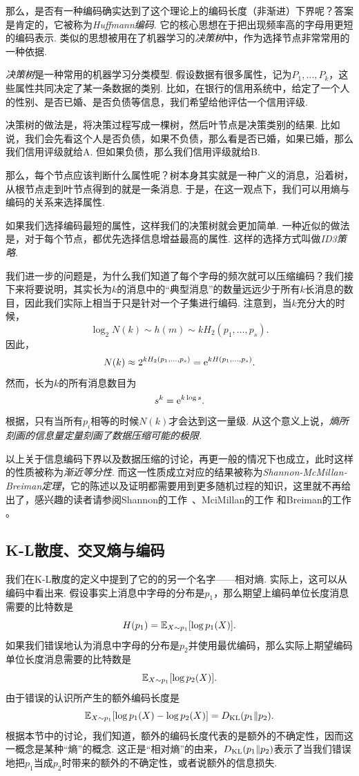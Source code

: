 那么，是否有一种编码确实达到了这个理论上的编码长度（非渐进）下界呢？答案是肯定的，它被称为\textit{Huffmann编码}. 它的核心思想在于把出现频率高的字母用更短的编码表示. 类似的思想被用在了机器学习的\textit{决策树}中，作为选择节点非常常用的一种依据.
\begin{remark}
    \textit{决策树}是一种常用的机器学习分类模型. 假设数据有很多属性，记为$P_1,\dots,P_k$，这些属性共同决定了某一条数据的类别. 比如，在银行的信用系统中，给定了一个人的性别、是否已婚、是否负债等信息，我们希望给他评估一个信用评级. 
    
    决策树的做法是，将决策过程写成一棵树，然后叶节点是决策类别的结果. 比如说，我们会先看这个人是否负债，如果不负债，那么看是否已婚，如果已婚，那么我们信用评级就给A. 但如果负债，那么我们信用评级就给B. 
    
    那么，每个节点应该判断什么属性呢？树本身其实就是一种广义的消息，沿着树，从根节点走到叶节点得到的就是一条消息. 于是，在这一观点下，我们可以用熵与编码的关系来选择属性. 

    如果我们选择编码最短的属性，这样我们的决策树就会更加简单. 一种近似的做法是，对于每个节点，都优先选择信息增益最高的属性. 这样的选择方式叫做\textit{ID3策略}.
\end{remark}

我们进一步的问题是，为什么我们知道了每个字母的频次就可以压缩编码？我们接下来将要说明，其实长为$k$的消息中的“典型消息”的数量远远少于所有$k$长消息的数目，因此我们实际上相当于只是针对一个子集进行编码. 注意到，当$k$充分大的时候，
\[\log_2 N(k)\sim h(m)\sim kH_2(p_1,\dots,p_s).\]
因此，
\[N(k)\approx 2^{kH_2(p_1,\dots,p_s)}=\mathrm{e}^{kH(p_1,\dots,p_s)}.\]
然而，长为$k$的所有消息数目为
\[s^k=\mathrm{e}^{k\log s}.\]
根据，只有当所有$p_i$相等的时候$N(k)$才会达到这一量级. 从这个意义上说，\textit{熵所刻画的信息量定量刻画了数据压缩可能的极限.}

以上关于信息编码下界以及数据压缩的讨论，再更一般的情况下也成立，此时这样的性质被称为\textit{渐近等分性}. 而这一性质成立对应的结果被称为\textit{Shannon-McMillan-Breiman定理}，它的陈述以及证明都需要用到更多随机过程的知识，这里就不再给出了，感兴趣的读者请参阅Shannon的工作~\cite{shannonMathematicalTheoryCommunication1948}、MciMillan的工作 \cite{mcmillanBasicTheoremsInformation1953} 和Breiman的工作 \cite{breimanIndividualErgodicTheorem1957}。

\subsection{K-L散度、交叉熵与编码}

我们在K-L散度的定义中提到了它的的另一个名字——相对熵. 实际上，这可以从编码中看出来. 假设事实上消息中字母的分布是$p_1$，那么期望上编码单位长度消息需要的比特数是
\[H(p_1)=\mathbb{E}_{X\sim p_1}[\log p_1(X)].\] 
如果我们错误地认为消息中字母的分布是$p_2$并使用最优编码，那么实际上期望编码单位长度消息需要的比特数是
\[\mathbb{E}_{X\sim p_1}[\log p_2(X)].\]
由于错误的认识所产生的额外编码长度是
\[\mathbb{E}_{X\sim p_1}[\log p_1(X)-\log p_2(X)]=D_{\mathrm{KL}}(p_1\Vert p_2).\]
根据本节中的讨论，我们知道，额外的编码长度代表的是额外的不确定性，因而这一概念是某种“熵”的概念. 这正是“相对熵”的由来，$D_{\mathrm{KL}}(p_1\Vert p_2)$表示了当我们错误地把$p_1$当成$p_2$时带来的额外的不确定性，或者说额外的信息损失.

